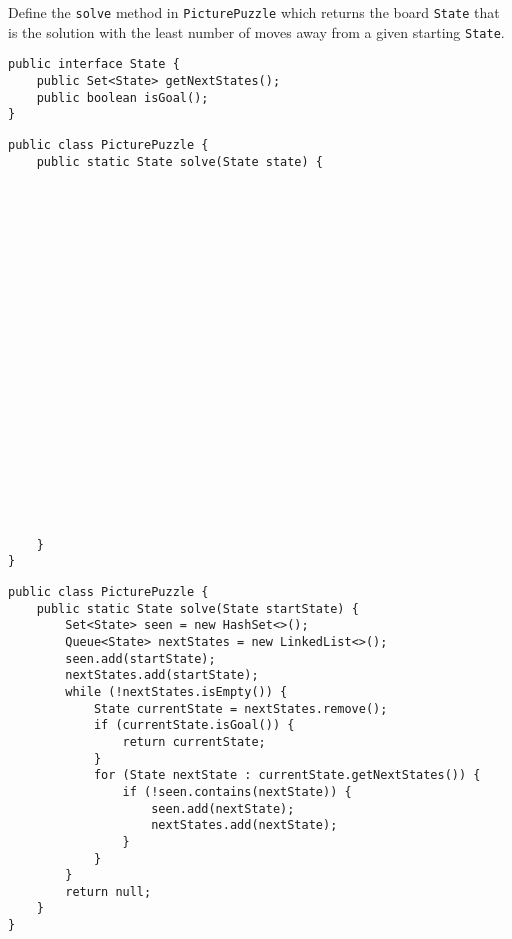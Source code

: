 \begin{blocksection}
\question Define the \lstinline$solve$ method in \lstinline$PicturePuzzle$
which returns the board \lstinline$State$ that is the solution with the least
number of moves away from a given starting \lstinline$State$.

\begin{lstlisting}
public interface State {
    public Set<State> getNextStates();
    public boolean isGoal();
}
\end{lstlisting}

\ifprintanswers\else
\begin{lstlisting}
public class PicturePuzzle {
    public static State solve(State state) {






















    }
}
\end{lstlisting}
\fi

\begin{solution}
\begin{lstlisting}
public class PicturePuzzle {
    public static State solve(State startState) {
        Set<State> seen = new HashSet<>();
        Queue<State> nextStates = new LinkedList<>();
        seen.add(startState);
        nextStates.add(startState);
        while (!nextStates.isEmpty()) {
            State currentState = nextStates.remove();
            if (currentState.isGoal()) {
                return currentState;
            }
            for (State nextState : currentState.getNextStates()) {
                if (!seen.contains(nextState)) {
                    seen.add(nextState);
                    nextStates.add(nextState);
                }
            }
        }
        return null;
    }
}
\end{lstlisting}
\end{solution}
\end{blocksection}
